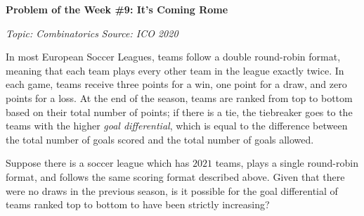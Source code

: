 \begin{potw}\vspace{5pt}
{\large\textbf{Problem of the Week \#9: It's Coming Rome}}\vspace{5pt}

\textit{Topic: Combinatorics}\newline
\textit{Source: ICO 2020}\V

In most European Soccer Leagues, teams follow a double round-robin format, meaning that each team plays every other team in the league exactly twice. In each game, teams receive three points for a win, one point for a draw, and zero points for a loss. At the end of the season, teams are ranked from top to bottom based on their total number of points; if there is a tie, the tiebreaker goes to the teams with the higher \textit{goal differential}, which is equal to the difference between the total number of goals scored and the total number of goals allowed.\V

Suppose there is a soccer league which has $2021$ teams, plays a single round-robin format, and follows the same scoring format described above. Given that there were no draws in the previous season, is it possible for the goal differential of teams ranked top to bottom to have been strictly increasing?
\end{potw}\V
